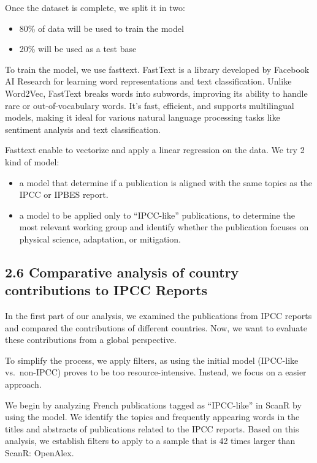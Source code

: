 \documentclass[
]{article}
\providecommand{\tightlist}{%
  \setlength{\itemsep}{0pt}\setlength{\parskip}{0pt}}
\begin{document}
Once the dataset is complete, we split it in two:

\begin{itemize}
\tightlist
\item
  80\% of data will be used to train the model
\item
  20\% will be used as a test base
\end{itemize}

To train the model, we use fasttext. FastText is a library developed by
Facebook AI Research for learning word representations and text
classification. Unlike Word2Vec, FastText breaks words into subwords,
improving its ability to handle rare or out-of-vocabulary words. It's
fast, efficient, and supports multilingual models, making it ideal for
various natural language processing tasks like sentiment analysis and
text classification.

Fasttext enable to vectorize and apply a linear regression on the data.
We try 2 kind of model:

\begin{itemize}
\tightlist
\item
  a model that determine if a publication is aligned with the same
  topics as the IPCC or IPBES report.
\item
  a model to be applied only to ``IPCC-like'' publications, to determine
  the most relevant working group and identify whether the publication
  focuses on physical science, adaptation, or mitigation.
\end{itemize}

\hypertarget{comparative-analysis-of-country-contributions-to-ipcc-reports}{%
\subsection{2.6 Comparative analysis of country contributions to IPCC
Reports}\label{comparative-analysis-of-country-contributions-to-ipcc-reports}}

In the first part of our analysis, we examined the publications from
IPCC reports and compared the contributions of different countries. Now,
we want to evaluate these contributions from a global perspective.

To simplify the process, we apply filters, as using the initial model
(IPCC-like vs.~non-IPCC) proves to be too resource-intensive. Instead,
we focus on a easier approach.

We begin by analyzing French publications tagged as ``IPCC-like'' in
ScanR by using the model. We identify the topics and frequently
appearing words in the titles and abstracts of publications related to
the IPCC reports. Based on this analysis, we establish filters to apply
to a sample that is 42 times larger than ScanR: OpenAlex.
\end{document}
